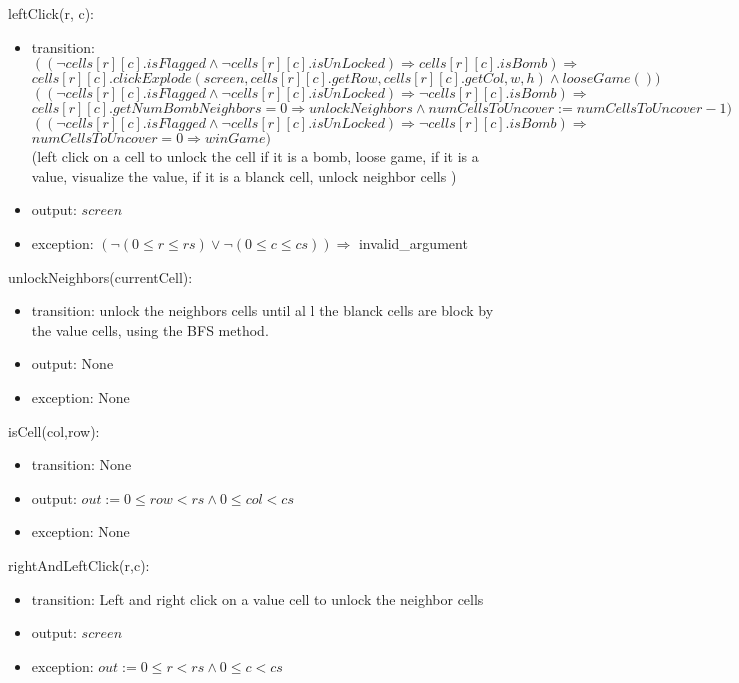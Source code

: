 \documentclass[12pt]{article}
\begin{document}
\noindent leftClick(r, c):
\begin{itemize}
\item transition: $((\neg cells[r][c].isFlagged \land \neg cells[r][c].isUnLocked)\Rightarrow cells[r][c].isBomb) \Rightarrow$\\$ cells[r][c].clickExplode(screen,cells[r][c].getRow,cells[r][c].getCol,w,h) \land looseGame())$\\
$((\neg cells[r][c].isFlagged \land \neg cells[r][c].isUnLocked)\Rightarrow \neg cells[r][c].isBomb) \Rightarrow$\\$ cells[r][c].getNumBombNeighbors = 0 \Rightarrow unlockNeighbors \land numCellsToUncover:=numCellsToUncover-1)$\\
$((\neg cells[r][c].isFlagged \land \neg cells[r][c].isUnLocked)\Rightarrow \neg cells[r][c].isBomb) \Rightarrow$\\$ numCellsToUncover =0 \Rightarrow winGame)$\\
(left click on a cell to unlock the cell if it is a bomb, loose game, if it is a value, visualize the value, if it is a blanck cell, unlock neighbor cells )
\item output: $screen$
\item exception: $(\neg (0\leq r\leq rs) \lor \neg (0\leq c\leq cs))\Rightarrow$ invalid\_argument
\end{itemize}

\noindent unlockNeighbors(currentCell):
\begin{itemize}
\item transition: unlock the neighbors cells until al l the blanck cells are block by the value cells, using the BFS method.
\item output: None
\item exception: None
\end{itemize}

\noindent isCell(col,row):
\begin{itemize}
\item transition: None
\item output: $out:=0\leq row < rs \land 0 \leq col < cs$
\item exception: None
\end{itemize}

\noindent rightAndLeftClick(r,c):
\begin{itemize}
\item transition: Left and right click on a value cell to unlock the neighbor cells
\item output: $screen$
\item exception: $out:=0\leq r < rs \land 0 \leq c < cs$
\end{itemize}
\end{document}
